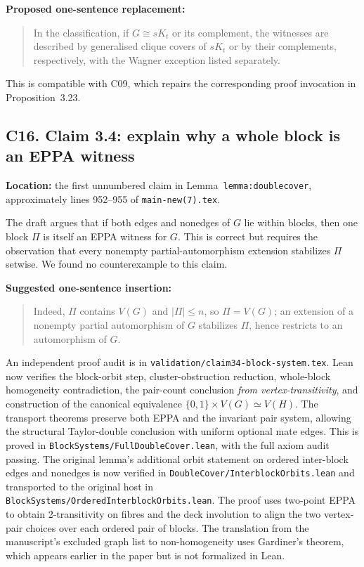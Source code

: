 \documentclass[11pt,a4paper]{article}
\begin{document}
\textbf{Proposed one-sentence replacement:}
\begin{quote}
In the classification, if \(G\cong sK_t\) or its
complement, the witnesses are described by
generalised clique covers of \(sK_t\) or by
their complements, respectively, with the
Wagner exception listed separately.
\end{quote}
This is compatible with C09, which repairs the
corresponding proof invocation in Proposition~3.23.

\subsection*{C16. Claim 3.4: explain why a whole block is an EPPA witness}
\textbf{Location:} the first unnumbered claim in
Lemma~\texttt{lemma:doublecover}, approximately
lines 952--955 of \texttt{main-new(7).tex}.

The draft argues that if both edges and nonedges of
\(G\) lie within blocks, then one block \(\Pi\)
is itself an EPPA witness for \(G\).
This is correct but requires the observation that
every nonempty partial-automorphism extension stabilizes
\(\Pi\) setwise. We found no counterexample to this claim.

\textbf{Suggested one-sentence insertion:}
\begin{quote}
Indeed, \(\Pi\) contains \(V(G)\) and
\(|\Pi|\le n\), so \(\Pi=V(G)\);
an extension of a nonempty partial automorphism
of \(G\) stabilizes \(\Pi\), hence restricts
to an automorphism of \(G\).
\end{quote}

An independent proof audit is in
\texttt{validation/claim34-block-system.tex}.
Lean now verifies the block-orbit step,
cluster-obstruction reduction, whole-block
homogeneity contradiction, the pair-count
conclusion \emph{from vertex-transitivity},
and construction of the canonical equivalence
\(\{0,1\}\times V(G)\simeq V(H)\).
The transport theorems preserve both EPPA
and the invariant pair system, allowing the
structural Taylor-double conclusion with
uniform optional mate edges.
This is proved in
\texttt{BlockSystems/FullDoubleCover.lean},
with the full axiom audit passing.
The original lemma's additional orbit
statement on ordered inter-block edges
and nonedges is now verified in
\texttt{DoubleCover/InterblockOrbits.lean}
and transported to the original host in
\texttt{BlockSystems/OrderedInterblockOrbits.lean}.
The proof uses two-point EPPA to obtain
2-transitivity on fibres and the deck
involution to align the two vertex-pair
choices over each ordered pair of blocks.
The translation from the manuscript's
excluded graph list to non-homogeneity
uses Gardiner's theorem, which appears
earlier in the paper but is not formalized
in Lean.
\end{document}
